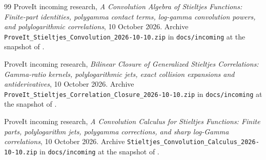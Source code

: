 \begin{thebibliography}{99}
ProveIt incoming research,
\emph{A Convolution Algebra of Stieltjes Functions: Finite-part
identities, polygamma contact terms, log-gamma convolution powers,
and polylogarithmic correlations}, 10 October 2026.
Archive \texttt{ProveIt\_Stieltjes\_Convolution\_2026-10-10.zip}
in \texttt{docs/incoming} at the snapshot of \cite{ProveIt}.

ProveIt incoming research,
\emph{Bilinear Closure of Generalized Stieltjes Correlations:
Gamma-ratio kernels, polylogarithmic jets, exact collision expansions
and antiderivatives}, 10 October 2026.
Archive \texttt{ProveIt\_Stieltjes\_Correlation\_Closure\_2026-10-10.zip}
in \texttt{docs/incoming} at the snapshot of \cite{ProveIt}.

ProveIt incoming research,
\emph{A Convolution Calculus for Stieltjes Functions: Finite parts,
polylogarithm jets, polygamma corrections, and sharp log-Gamma
correlations}, 10 October 2026.
Archive \texttt{Stieltjes\_Convolution\_Calculus\_2026-10-10.zip}
in \texttt{docs/incoming} at the snapshot of \cite{ProveIt}.

\end{thebibliography}
